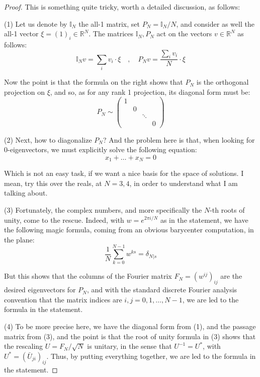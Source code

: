 \documentclass[12pt]{amsbook}
\begin{document}
\begin{proof}
This is something quite tricky, worth a detailed discussion, as follows:

\medskip

(1) Let us denote by $\mathbb I_N$ the all-1 matrix, set $P_N=\mathbb I_N/N$, and consider as well the all-1 vector $\xi=(1)_i\in\mathbb R^N$. The matrices $\mathbb I_N,P_N$ act on the vectors $v\in\mathbb R^N$ as follows:
$$\mathbb I_Nv=\sum_iv_i\cdot\xi\quad,\quad P_Nv=\frac{\sum_iv_i}{N}\cdot\xi$$

Now the point is that the formula on the right shows that $P_N$ is the orthogonal projection on $\xi$, and so, as for any rank 1 projection, its diagonal form must be:
$$P_N\sim
\begin{pmatrix}
1\\
&0\\
&&\ddots\\
&&&0
\end{pmatrix}$$

(2) Next, how to diagonalize $P_N$? And the problem here is that, when looking for 0-eigenvectors, we must explicitly solve the following equation:
$$x_1+\ldots+x_N=0$$

Which is not an easy task, if we want a nice basis for the space of solutions. I mean, try this over the reals, at $N=3,4$, in order to understand what I am talking about.

\medskip

(3) Fortunately, the complex numbers, and more specifically the $N$-th roots of unity, come to the rescue. Indeed, with $w=e^{2\pi i/N}$ as in the statement, we have the following magic formula, coming from an obvious barycenter computation, in the plane:
$$\frac{1}{N}\sum_{k=0}^{N-1}w^{ks}=\delta_{N|s}$$

But this shows that the columns of the Fourier matrix $F_N=(w^{ij})_{ij}$ are the desired eigenvectors for $P_N$, and with the standard discrete Fourier analysis convention that the matrix indices are $i,j=0,1,\ldots,N-1$, we are led to the formula in the statement.

\medskip

(4) To be more precise here, we have the diagonal form from (1), and the passage matrix from (3), and the point is that the root of unity formula in (3) shows that the rescaling $U=F_N/\sqrt{N}$ is unitary, in the sense that $U^{-1}=U^*$, with $U^*=(\bar{U}_{ji})_{ij}$. Thus, by putting everything together, we are led to the formula in the statement.
\end{proof}
\end{document}
